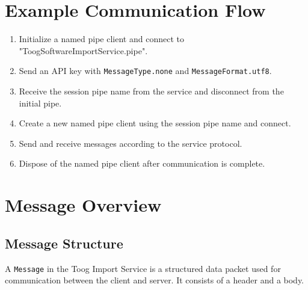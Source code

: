 \documentclass{memoir}
\begin{document}
	\section{Example Communication Flow}
	\begin{enumerate}
		\item Initialize a named pipe client and connect to "ToogSoftwareImportService.pipe".
		\item Send an API key with \texttt{MessageType.none} and \texttt{MessageFormat.utf8}.
		\item Receive the session pipe name from the service and disconnect from the initial pipe.
		\item Create a new named pipe client using the session pipe name and connect.
		\item Send and receive messages according to the service protocol.
		\item Dispose of the named pipe client after communication is complete.
	\end{enumerate}
	
	\section{Message Overview}
	
	\subsection{Message Structure}
	A \texttt{Message} in the Toog Import Service is a structured data packet used for communication between the client and server. It consists of a header and a body.
	
\end{document}
